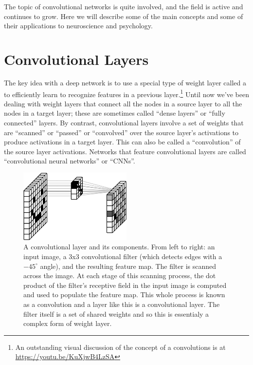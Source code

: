 The topic of convolutional networks is quite involved, and the field is active and continues to grow. Here we will describe some of the main concepts and some of their applications to neuroscience and psychology.

\section{Convolutional Layers}\label{convolutionalLayer}


The key idea with a deep network is to use a special type of weight layer called a  to efficiently learn to recognize features in a previous layer.\footnote{An outstanding visual discussion of the concept of a convolutions is at \url{https://youtu.be/KuXjwB4LzSA}} Until now we've been dealing with weight layers that connect all the nodes in a source layer to all the nodes in a target layer; these are sometimes called ``dense layers'' or ``fully connected'' layers. By contrast, convolutional layers involve a set of weights that are ``scanned'' or ``passed'' or ``convolved'' over the source layer's activations to produce activations in a target layer. This can also be called a ``convolution'' of the source layer activations. Networks that feature convolutional layers are called ``convolutional neural networks'' or ``CNNs''.

\begin{figure}[h]
\centering
\includegraphics[width=0.5\textwidth]{images/happyConvolution.png}
\caption[Soraya Boza, adapting this image from User Cecbur, \url{https://commons.wikimedia.org/wiki/File:Convolutional_Neural_Network_NeuralNetworkFilter.gif}, with labels added by Jeff Yoshimi.]{A convolutional layer and its components. From left to right: an input image, a 3x3 convolutional filter (which detects edges with a $-45^\circ$ angle), and the resulting feature map. The filter is scanned across the image. At each stage of this scanning process, the dot product of the filter's receptive field in the input image is computed and used to populate the feature map. This whole process is known as a convolution and a layer like this is a convolutional layer. The filter itself is a set of shared weights and so this is essentialy a complex form of weight layer.}
\label{cnn_filter}
\end{figure}

